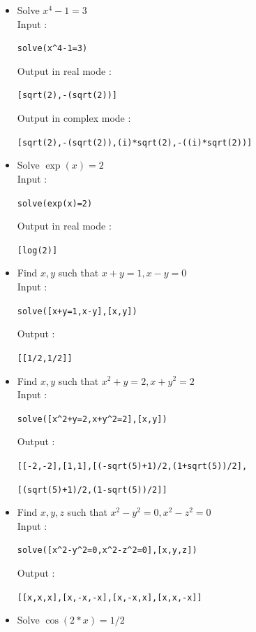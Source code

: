 \documentclass[a4paper,11pt]{book}
\begin{document}
\begin{itemize}
\item Solve $x^4-1=3$\\
 Input :
\begin{center}{\tt  solve(x\verb|^|4-1=3)}\end{center}
Output in real mode :
\begin{center}{\tt [sqrt(2),-(sqrt(2))]}\end{center}
Output in complex mode :
\begin{center}{\tt [sqrt(2),-(sqrt(2)),(i)*sqrt(2),-((i)*sqrt(2))]}\end{center}
\item Solve $\exp(x)=2$ \\
Input :
\begin{center}{\tt  solve(exp(x)=2)}\end{center}
Output in real mode :
\begin{center}{\tt [log(2)]}\end{center}
\item Find $x,y$ such that $x+y=1,x-y=0$\\
 Input :
\begin{center}{\tt  solve([x+y=1,x-y],[x,y])}\end{center}
Output :
\begin{center}{\tt [[1/2,1/2]] }\end{center}
\item Find $x,y$ such that $x^2+y=2,x+y^2=2$\\
Input :
\begin{center}{\tt  solve([x\verb|^|2+y=2,x+y\verb|^|2=2],[x,y])}\end{center}
Output :
\begin{center}{\tt [[-2,-2],[1,1],[(-sqrt(5)+1)/2,(1+sqrt(5))/2],}\end{center}
\begin{center}{\tt [(sqrt(5)+1)/2,(1-sqrt(5))/2]] }\end{center}
\item Find $x,y,z$ such that $x^2-y^2=0,x^2-z^2=0$\\
Input :
\begin{center}{\tt  solve([x\verb|^|2-y\verb|^|2=0,x\verb|^|2-z\verb|^|2=0],[x,y,z])}\end{center}
Output :
\begin{center}{\tt [[x,x,x],[x,-x,-x],[x,-x,x],[x,x,-x]]}\end{center}
\item Solve $\cos(2*x)=1/2$\\

\end{itemize}
\end{document}
